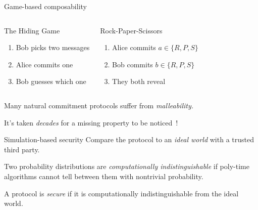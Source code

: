 \documentclass{beamer}
\begin{document}
\begin{frame}{Game-based composability}
	\begin{columns}
		\begin{block}{The Hiding Game}
			\begin{enumerate}
				\item Bob picks two messages
				\item Alice commits one
				\item Bob guesses which one
			\end{enumerate}
		\end{block}
		\begin{block}{Rock-Paper-Scissors}
			\begin{enumerate}
				\item Alice commits $a\in\{R,P,S\}$
				\item Bob commits $b\in\{R,P,S\}$
				\item They both reveal
			\end{enumerate}
		\end{block}
	\end{columns}
	\pause\hrulefill

	Many natural commitment protocols suffer from \emph{malleability.}\pause

	It's taken \emph{decades} for a missing property to be
	noticed~\cite{asher-qkd,bhlmo-qkd}!
\end{frame}

\begin{frame}{Simulation-based security}
	\pause
	Compare the protocol to an \emph{ideal world} with a trusted third party.\pause


	Two probability distributions are \emph{computationally indistinguishable} if
	poly-time algorithms cannot tell between them with nontrivial probability.
	\pause

	A protocol is \emph{secure} if it is computationally indistinguishable
	from the ideal world.\pause
\end{frame}
\end{document}
